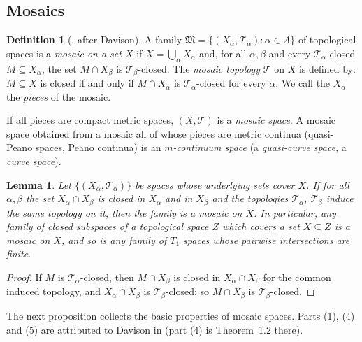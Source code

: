 \documentclass[11pt]{amsart}
\newtheorem{lemma}[theorem]{Lemma}
\theoremstyle{definition}
\newtheorem{definition}[theorem]{Definition}
\theoremstyle{remark}
\newcommand{\cT}{\mathcal{T}}
\newcommand{\fM}{\mathfrak{M}}
\numberwithin{equation}{section}
\begin{document}
\subsection{Mosaics}
\begin{definition}[{\cite[p.~1327]{lavallee64}}, after Davison]\label{def:mosaic}
A family $\fM=\{(X_\alpha,\cT_\alpha):\alpha\in A\}$ of topological spaces is a \emph{mosaic on a set $X$} if $X=\bigcup_\alpha X_\alpha$ and, for all $\alpha,\beta$ and every $\cT_\alpha$-closed $M\subseteq X_\alpha$, the set $M\cap X_\beta$ is $\cT_\beta$-closed. The \emph{mosaic topology} $\cT$ on $X$ is defined by: $M\subseteq X$ is closed if and only if $M\cap X_\alpha$ is $\cT_\alpha$-closed for every $\alpha$. We call the $X_\alpha$ the \emph{pieces} of the mosaic.

If all pieces are compact metric spaces, $(X,\cT)$ is a \emph{mosaic space}. A mosaic space obtained from a mosaic all of whose pieces are metric continua (quasi-Peano spaces, Peano continua) is an \emph{$m$-continuum space} (a \emph{quasi-curve space}, a \emph{curve space}).
\end{definition}

\begin{lemma}\label{lem:recognise}
Let $\{(X_\alpha,\cT_\alpha)\}$ be spaces whose underlying sets cover $X$. If for all $\alpha,\beta$ the set $X_\alpha\cap X_\beta$ is closed in $X_\alpha$ and in $X_\beta$ and the topologies $\cT_\alpha$, $\cT_\beta$ induce the same topology on it, then the family is a mosaic on $X$. In particular, any family of closed subspaces of a topological space $Z$ which covers a set $X\subseteq Z$ is a mosaic on $X$, and so is any family of $T_1$ spaces whose pairwise intersections are finite.
\end{lemma}
\begin{proof}
If $M$ is $\cT_\alpha$-closed, then $M\cap X_\beta$ is closed in $X_\alpha\cap X_\beta$ for the common induced topology, and $X_\alpha\cap X_\beta$ is $\cT_\beta$-closed; so $M\cap X_\beta$ is $\cT_\beta$-closed.
\end{proof}

The next proposition collects the basic properties of mosaic spaces. Parts (1), (4) and (5) are attributed to Davison in \cite[Section~1]{lavallee64} (part (4) is Theorem~1.2 there).
\end{document}
